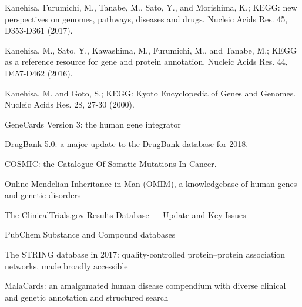  Kanehisa, Furumichi, M., Tanabe, M., Sato, Y., and Morishima, K.; 
\newblock KEGG: new perspectives on genomes, pathways, diseases and drugs. 
\newblock Nucleic Acids Res. 45, D353-D361 (2017).

 Kanehisa, M., Sato, Y., Kawashima, M., Furumichi, M., and Tanabe, M.; 
\newblock KEGG as a reference resource for gene and protein annotation. 
\newblock Nucleic Acids Res. 44, D457-D462 (2016).

 Kanehisa, M. and Goto, S.; 
\newblock KEGG: Kyoto Encyclopedia of Genes and Genomes. 
\newblock Nucleic Acids Res. 28, 27-30 (2000).

GeneCards Version 3: the human gene integrator

 DrugBank 5.0: a major update to the DrugBank database for 2018.

 COSMIC: the Catalogue Of Somatic Mutations In Cancer.

 Online Mendelian Inheritance in Man (OMIM), a knowledgebase of human genes and genetic disorders

 The ClinicalTrials.gov Results Database — Update and Key Issues

 PubChem Substance and Compound databases

 The STRING database in 2017: quality-controlled protein–protein association networks, made broadly accessible

 MalaCards: an amalgamated human disease compendium with diverse clinical and genetic annotation and structured search
